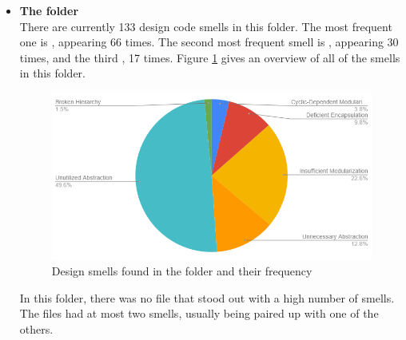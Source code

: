         \begin{itemize}
            \item \textbf{The  folder}\\
            There are currently 133 design code smells in this folder. The most frequent one is , appearing 66 times. The second most frequent smell is , appearing 30 times, and the third , 17 times. Figure \ref{fig:apidesignsmells} gives an overview of all of the smells in this folder.
            \begin{figure}[H]
                \centering
                \includegraphics[scale=0.7]{figures/step4/designsmellapiPNG.PNG}
                \caption{Design smells found in the  folder and their frequency}
                \label{fig:apidesignsmells}
            \end{figure}
            In this folder, there was no file that stood out with a high number of smells. The files had at most two smells, usually being  paired up with one of the others.
            

\end{itemize}
